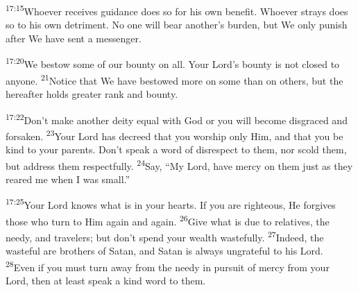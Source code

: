\documentclass[openany,12pt,english]{book}
\newenvironment{para}{\par\pretolerance=100\tolerance=200\setlength{\emergencystretch}{0.6em}\relax}{\par}
\begin{document}
\bigskip{}

\begin{para}
    \textsuperscript{17:15}\thinspace{}Who\-ev\-er receives guid\-ance does so for his own ben\-e\-fit. Who\-ev\-er strays does so to his own det\-ri\-ment. No one will bear another's bur\-den, but We on\-ly pun\-ish af\-ter We have sent a mes\-sen\-ger.
\end{para}

\begin{para}
    \textsuperscript{17:20}\thinspace{}We be\-stow some of our boun\-ty on all. Your Lord's boun\-ty is not closed to any\-one.
    \textsuperscript{21}\thinspace{}No\-tice that We have bestowed more on some than on others, but the here\-af\-ter holds greater rank and boun\-ty.
\end{para}

\begin{para}
    \textsuperscript{17:22}\thinspace{}Don't make an\-oth\-er de\-i\-ty e\-qual with God or you will be\-come dis\-graced and for\-sak\-en.
    \textsuperscript{23}\thinspace{}Your Lord has de\-creed that you wor\-ship on\-ly Him, and that you be kind to your parents. Don't speak a word of dis\-re\-spect to them, nor scold them, but ad\-dress them re\-spect\-ful\-ly.
    \textsuperscript{24}\thinspace{}Say, “My Lord, have mer\-cy on them just as they reared me when I was small.”
\end{para}

\begin{para}
    \textsuperscript{17:25}\thinspace{}Your Lord knows what is in your hearts. If you are right\-eous, He forgives those who turn to Him a\-gain and a\-gain.
    \textsuperscript{26}\thinspace{}Give what is due to relatives, the needy, and travelers; but don't spend your wealth wastefully.
    \textsuperscript{27}\thinspace{}In\-deed, the waste\-ful are brothers of Satan, and Satan is al\-ways un\-grate\-ful to his Lord.
    \textsuperscript{28}\thinspace{}E\-ven if you must turn a\-way from the needy in pur\-suit of mer\-cy from your Lord, then at least speak a kind word to them.
\end{para}
\end{document}
